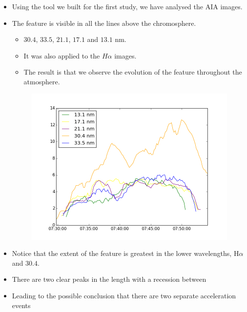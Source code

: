 \documentclass{beamer}
\begin{document}
	\begin{frame}
		\begin{itemize}
			\item{Using the tool we built for the first study, we have analysed the AIA images.}
			\item{The feature is visible in all the lines above the chromosphere.}
			\begin{itemize}
				\item{$30.4$, $33.5$, $21.1$, $17.1$ and $13.1$ nm.}
				\item{It was also applied to the $H\alpha$ images.}
				\item{The result is that we observe the evolution of the feature throughout the atmosphere.}
			\end{itemize}
			\begin{figure}
				\includegraphics[scale=0.32]{Figs/len_plot.png}
			\end{figure}
		\end{itemize}
	\end{frame}
	
	\begin{frame}
		\begin{itemize}
			\item{Notice that the extent of the feature is greatest in the lower wavelengths, H$\alpha$ and $30.4$.}
		\end{itemize}
			\begin{itemize}
				\item{There are two clear peaks in the length with a recession between}
				\item{Leading to the possible conclusion that there are two separate acceleration events}
			\end{itemize}
	\end{frame}
	
\end{document}
